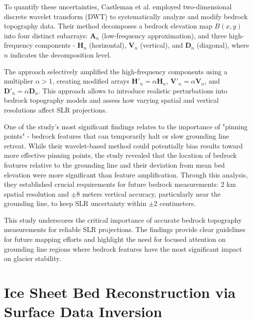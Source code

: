 To quantify these uncertainties, Castleman et al.\cite{Castleman_2022} employed two-dimensional discrete wavelet transform (DWT) to systematically analyze and modify bedrock topography data. Their method decomposes a bedrock elevation map $B(x,y)$ into four distinct subarrays: $\mathbf{A}_n$ (low-frequency approximation), and three high-frequency components - $\mathbf{H}_n$ (horizontal), $\mathbf{V}_n$ (vertical), and $\mathbf{D}_n$ (diagonal), where $n$ indicates the decomposition level. 

The approach selectively amplified the high-frequency components using a multiplier $\alpha > 1$, creating modified arrays $\mathbf{H}'_n = \alpha\mathbf{H}_n$, $\mathbf{V}'_n = \alpha\mathbf{V}_n$, and $\mathbf{D}'_n = \alpha\mathbf{D}_n$. This approach allows to introduce realistic perturbations into bedrock topography models and assess how varying spatial and vertical resolutions affect SLR projections.

One of the study's most significant findings relates to the importance of "pinning points" - bedrock features that can temporarily halt or slow grounding line retreat. While their wavelet-based method could potentially bias results toward more effective pinning points, the study revealed that the location of bedrock features relative to the grounding line and their deviation from mean bed elevation were more significant than feature amplification\cite{Castleman_2022}. Through this analysis, they established crucial requirements for future bedrock measurements: 2 km spatial resolution and $\pm$8 meters vertical accuracy, particularly near the grounding line, to keep SLR uncertainty within $\pm$2 centimeters.

This study underscores the critical importance of accurate bedrock topography measurements for reliable SLR projections. The findings provide clear guidelines for future mapping efforts and highlight the need for focused attention on grounding line regions where bedrock features have the most significant impact on glacier stability.

\section{Ice Sheet Bed Reconstruction via  Surface Data Inversion}\label{Ockenden_2022}

